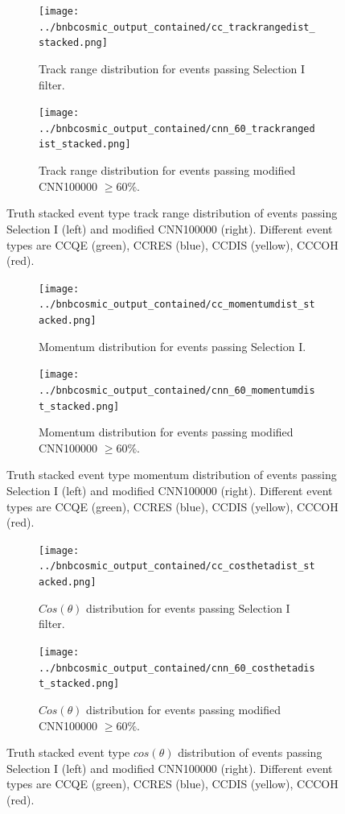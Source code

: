 \begin{figure}[htp!]
\centering
	\begin{subfigure}[b]{.475\textwidth}
	\centering
		\texttt{[image: ../bnbcosmic\_output\_contained/cc\_trackrangedist\_stacked.png]}
		\caption{Track range distribution for events passing Selection I filter.} 
		\label{fig:cctrackstacked_modified}
	\end{subfigure}
	\quad
	\begin{subfigure}[b]{.475\textwidth}
	\centering
		\texttt{[image: ../bnbcosmic\_output\_contained/cnn\_60\_trackrangedist\_stacked.png]}
		\caption{Track range distribution for events passing modified CNN100000 $\geq 60\%$.} 
		\label{fig:cnn60trackstacked_modified}
	\end{subfigure}
\caption{Truth stacked event type track range distribution of events passing Selection I (left) and modified CNN100000 (right). Different event types are CCQE (green), CCRES (blue), CCDIS (yellow), CCCOH (red).}
\label{fig:trackstacked_modified}
\end{figure}

\begin{figure}[htp!]
\centering
	\begin{subfigure}[b]{.475\textwidth}
	\centering
		\texttt{[image: ../bnbcosmic\_output\_contained/cc\_momentumdist\_stacked.png]}
		\caption{Momentum distribution for events passing Selection I.} 
		\label{fig:ccmomentumstacked_modified}
	\end{subfigure}
	\quad
	\begin{subfigure}[b]{.475\textwidth}
	\centering
		\texttt{[image: ../bnbcosmic\_output\_contained/cnn\_60\_momentumdist\_stacked.png]}
		\caption{Momentum distribution for events passing modified CNN100000 $\geq 60\%$.} 
		\label{fig:cnn60momentumstacked_modified}
	\end{subfigure}
\caption{Truth stacked event type momentum distribution of events passing Selection I (left) and modified CNN100000 (right). Different event types are CCQE (green), CCRES (blue), CCDIS (yellow), CCCOH (red).}
\label{fig:momentumstacked_modified}
\end{figure}

\begin{figure}[htp!]
\centering
	\begin{subfigure}[b]{.475\textwidth}
	\centering
		\texttt{[image: ../bnbcosmic\_output\_contained/cc\_costhetadist\_stacked.png]}
		\caption{$Cos(\theta)$ distribution for events passing Selection I filter.} 
		\label{fig:cccosthetastacked_modified}
	\end{subfigure}
	\quad
	\begin{subfigure}[b]{.475\textwidth}
	\centering
		\texttt{[image: ../bnbcosmic\_output\_contained/cnn\_60\_costhetadist\_stacked.png]}
		\caption{$Cos(\theta)$ distribution for events passing modified CNN100000 $\geq 60\%$.} 
		\label{fig:cnn60costhetastacked_modified}
	\end{subfigure}
\caption{Truth stacked event type $cos(\theta)$ distribution of events passing Selection I (left) and modified CNN100000 (right). Different event types are CCQE (green), CCRES (blue), CCDIS (yellow), CCCOH (red).}
\label{fig:costhetastacked_modified}
\end{figure}

